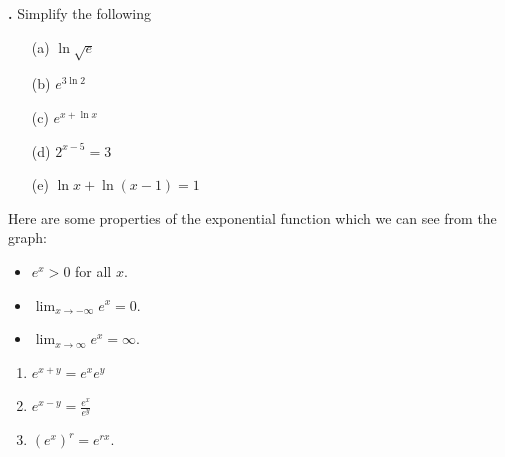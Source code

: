 \documentclass[t]{beamer}
\theoremstyle{plain}
\theoremstyle{definition}
\newcounter{heading}
\newcommand{\newhead}[1]{\medskip\stepcounter{heading}\noindent\textbf{\hspace{0.2cm}{#1}.}}
\newcommand{\limm}[1]{\displaystyle \lim_{x\to #1}}
\begin{document}
\begin{frame}
\newhead{Examples}
Simplify the following
\begin{enumerate}[<+->]
\item[(a)] $\ln\sqrt{e}$

\vspace*{.1cm}

\item[(b)] $e^{3\ln 2}$

\vspace*{.1cm}

\item[(c)] $e^{x + \ln x}$
\end{enumerate}
\vspace*{.1cm}
\begin{enumerate}[<+->]
\item[(d)] $2^{x-5} = 3$

\vspace*{.2cm}

\item[(e)] $\ln x + \ln(x-1) = 1$
\end{enumerate}

\end{frame}

\begin{frame}
\noindent Here are some properties of the exponential function which we can see from the graph:
\vspace*{.1cm}
\begin{itemize}[<+->]
\item $e^{x} > 0$ for all $x$.
\item $\limm{-\infty}e^{x} = 0$.
\item $\limm{\infty}e^{x} = \infty$.
\end{itemize}

\vspace*{.1cm}

\begin{enumerate}[<+->]
\item $e^{x+y} = e^{x}e^{y}$
\item $e^{x-y} = \frac{e^{x}}{e^{y}}$
\item $(e^{x})^{r} = e^{rx}.$
\end{enumerate}
\end{frame}
\end{document}
